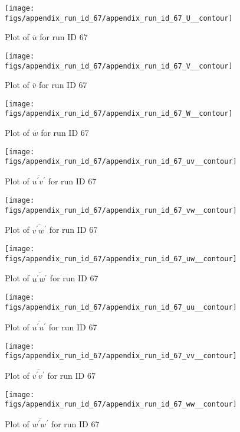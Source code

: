 \begin{figure}[H]
\centering
\texttt{[image: figs/appendix\_run\_id\_67/appendix\_run\_id\_67\_U\_\_contour]}
\caption{Plot of $\overline{u}$ for run ID 67}
\label{fig:appendix_run_id_67_U__contour}
\end{figure}


\begin{figure}[H]
\centering
\texttt{[image: figs/appendix\_run\_id\_67/appendix\_run\_id\_67\_V\_\_contour]}
\caption{Plot of $\overline{v}$ for run ID 67}
\label{fig:appendix_run_id_67_V__contour}
\end{figure}


\begin{figure}[H]
\centering
\texttt{[image: figs/appendix\_run\_id\_67/appendix\_run\_id\_67\_W\_\_contour]}
\caption{Plot of $\overline{w}$ for run ID 67}
\label{fig:appendix_run_id_67_W__contour}
\end{figure}


\begin{figure}[H]
\centering
\texttt{[image: figs/appendix\_run\_id\_67/appendix\_run\_id\_67\_uv\_\_contour]}
\caption{Plot of $\overline{u^\prime v^\prime}$ for run ID 67}
\label{fig:appendix_run_id_67_uv__contour}
\end{figure}


\begin{figure}[H]
\centering
\texttt{[image: figs/appendix\_run\_id\_67/appendix\_run\_id\_67\_vw\_\_contour]}
\caption{Plot of $\overline{v^\prime w^\prime}$ for run ID 67}
\label{fig:appendix_run_id_67_vw__contour}
\end{figure}


\begin{figure}[H]
\centering
\texttt{[image: figs/appendix\_run\_id\_67/appendix\_run\_id\_67\_uw\_\_contour]}
\caption{Plot of $\overline{u^\prime w^\prime}$ for run ID 67}
\label{fig:appendix_run_id_67_uw__contour}
\end{figure}


\begin{figure}[H]
\centering
\texttt{[image: figs/appendix\_run\_id\_67/appendix\_run\_id\_67\_uu\_\_contour]}
\caption{Plot of $\overline{u^\prime u^\prime}$ for run ID 67}
\label{fig:appendix_run_id_67_uu__contour}
\end{figure}


\begin{figure}[H]
\centering
\texttt{[image: figs/appendix\_run\_id\_67/appendix\_run\_id\_67\_vv\_\_contour]}
\caption{Plot of $\overline{v^\prime v^\prime}$ for run ID 67}
\label{fig:appendix_run_id_67_vv__contour}
\end{figure}


\begin{figure}[H]
\centering
\texttt{[image: figs/appendix\_run\_id\_67/appendix\_run\_id\_67\_ww\_\_contour]}
\caption{Plot of $\overline{w^\prime w^\prime}$ for run ID 67}
\label{fig:appendix_run_id_67_ww__contour}
\end{figure}


